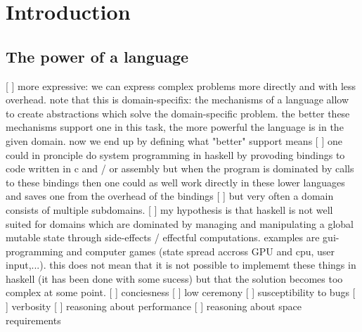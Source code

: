 \section{Introduction}

\subsection{The power of a language}
[ ] more expressive: we can express complex problems more directly and with less  overhead. note that this is domain-specifix: the mechanisms of a language allow to create abstractions which solve the domain-specific problem. the better these mechanisms support one in this task, the more powerful the language is in the given domain. now we end up by defining what "better" support means
[ ] one could in pronciple do system programming in haskell by provoding bindings to code written in c and / or assembly but when the program is dominated by calls to these bindings then one could as well work directly in these lower languages and saves one from the overhead of the bindings
[ ] but very often a domain consists of multiple subdomains.
[ ] my hypothesis is that haskell is not well suited for domains which are dominated by managing and manipulating a global mutable state through side-effects / effectful computations. examples are gui-programming and computer games (state spread accross GPU and cpu, user input,...). this does not mean that it is not possible to implememt these things in haskell (it has been done with some sucess) but that the solution becomes too complex at some point.
[ ] conciesness
[ ] low ceremony
[ ] susceptibility to bugs
[ ] verbosity
[ ] reasoning about performance
[ ] reasoning about space requirements